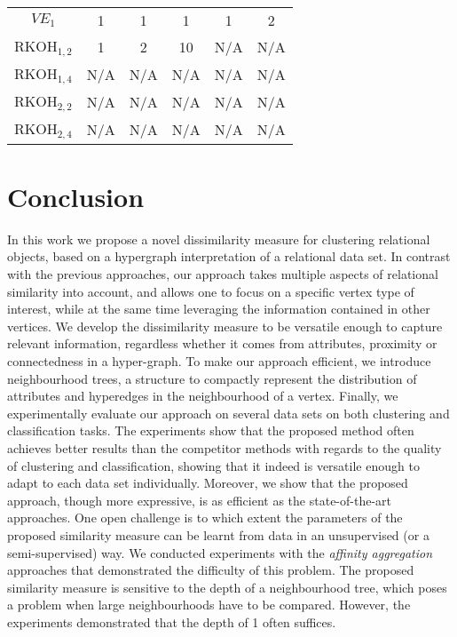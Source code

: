 \begin{table}
\begin{center}
\begin{tabular}[htb]{@{}cccccc@{}}
		$VE_1$			&	1		&	1	   &  	1	  &		1	   &   	2		\\
		
		RKOH$_{1,2}$	&	1		&	2	   &  	10	  &	N/A		   &   N/A			\\
		
		RKOH$_{1,4}$	&	N/A		&	N/A	   &  N/A 	  &  N/A	   &  N/A 		\\
		
		RKOH$_{2,2}$	&	N/A		&	N/A	   &  N/A 	  &  N/A	   &  N/A 		\\
		
		RKOH$_{2,4}$	&	N/A		&	N/A	   &  N/A 	  &  N/A	   &  N/A 		\\
		\bottomrule
		\end{tabular}				
		
	\end{center}

\end{table}



\section{Conclusion}

In this work we propose a novel dissimilarity measure for clustering relational objects, based on a hypergraph interpretation of a relational data set.
In contrast with the previous approaches, our approach takes multiple aspects of relational similarity into account, and  allows one to focus on a specific vertex type of interest, while at the same time leveraging the information contained in other vertices.
We develop the dissimilarity measure to be versatile enough to capture relevant information, regardless whether it comes from attributes, proximity or connectedness in a hyper-graph.
To make our approach efficient, we introduce neighbourhood trees, a structure to compactly represent the distribution of attributes and hyperedges in the neighbourhood of a vertex.
Finally, we experimentally evaluate our approach on several data sets on both clustering and classification tasks. 
The experiments show that the proposed method often achieves better results than the competitor methods with regards to the quality of clustering and classification, showing that it indeed is versatile enough to adapt to each data set individually.
Moreover, we show that the proposed approach, though more expressive, is as efficient as the state-of-the-art approaches.
One open challenge is to which extent the parameters of the proposed similarity measure can be learnt from data in an unsupervised (or a semi-supervised) way.
We conducted experiments with the \textit{affinity aggregation} approaches that demonstrated the difficulty of this problem.
The proposed similarity measure is  sensitive to the depth of a neighbourhood tree, which poses a problem when large neighbourhoods have to be compared.
However, the experiments demonstrated that the depth of 1 often suffices.



